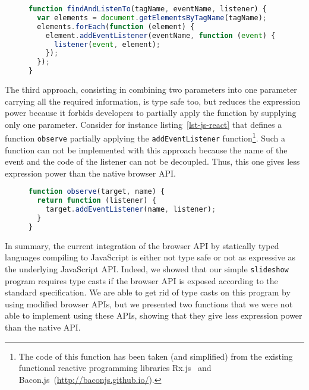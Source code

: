 \documentclass{llncs}
\newcommand{\jscode}[1]{\lstinline[language=JavaScript]|#1|}
\begin{document}
\begin{figure}
\begin{lstlisting}[label=lst-js-comb,language=JavaScript,caption={Combination of use of \jscode{getElementsByTagName} and \jscode{addEventListener}}]
function findAndListenTo(tagName, eventName, listener) {
  var elements = document.getElementsByTagName(tagName);
  elements.forEach(function (element) {
    element.addEventListener(eventName, function (event) {
      listener(event, element);
    });
  });
}
\end{lstlisting}
\end{figure}

The third approach, consisting in combining two parameters into one parameter carrying all the required information, is type safe too, but reduces the expression power because it forbids developers to partially apply the function by supplying only one parameter. Consider for instance listing~\ref{lst-js-react} that defines a function \jscode{observe} partially applying the \jscode{addEventListener} function\footnote{The code of this function has been taken (and simplified) from the existing functional reactive programming libraries Rx.js~\cite{liberty2011reactive} and Bacon.js~(\href{http://baconjs.github.io/}{http://baconjs.github.io/}).}. Such a function can not be implemented with this approach because the name of the event and the code of the listener can not be decoupled. Thus, this one gives less expression power than the native browser API.

\begin{figure}
\begin{lstlisting}[label=lst-js-react,language=JavaScript,caption={Partial application of \jscode{addEventListener} parameters}]
function observe(target, name) {
  return function (listener) {
    target.addEventListener(name, listener);
  }
}
\end{lstlisting}
\end{figure}

In summary, the current integration of the browser API by statically typed languages compiling to JavaScript is either not type safe or not as expressive as the underlying JavaScript API. Indeed, we showed that our simple \jscode{slideshow} program requires type casts if the browser API is exposed according to the standard specification. We are able to get rid of type casts on this program by using modified browser APIs, but we presented two functions that we were not able to implement using these APIs, showing that they give less expression power than the native API.
\end{document}
